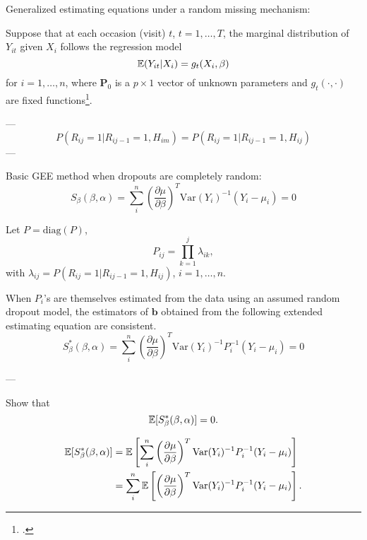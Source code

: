 \documentclass[UTF8,a4paper,10pt]{article}
\begin{document}
\begin{Problem}[]{Generalized estimating equations under a random missing mechanism:}



    Suppose that at each occasion (visit) $t$, $t = 1, \ldots, T$, the marginal distribution of $Y_{it}$ given $X_i$ follows the regression model
    \[
    \operatorname{\mathbb{E}}(Y_{it}|X_i) = g_t(X_i, \beta) 
    \]
    for $i = 1, \ldots, n$, where $\mathbf{P}_0$ is a $p \times 1$ vector of unknown parameters and $g_t(\cdot, \cdot)$ are fixed functions\Footcite[107]{Robins1995}.
    
---
\[
P(R_{ij}=1|R_{ij-1}=1, H_{im}) = P(R_{ij}=1|R_{ij-1}=1, H_{ij})
\]
---


Basic GEE method when dropouts are completely random:
\[
S_{\beta}(\beta,\alpha) = \sum_{i}^n \left(\frac{\partial \mu}{\partial \beta}\right)^T \text{Var}(Y_i)^{-1}(Y_i - \mu_i) = 0
\]

Let $P=\text{diag}(P)$, 
$$P_{ij}=\prod_{k=1}^{j} \lambda_{ik},$$ 
with $\lambda_{ij}=P(R_{ij}=1|R_{ij-1}=1,H_{ij})$, \(i = 1,\ldots,n\).

When $P_i$'s are themselves estimated from the data using an assumed random dropout model, the estimators of $\mathbf{b}$ obtained from the following extended estimating equation are consistent.
\[
S_{\beta}^*(\beta,\alpha) = \sum_{i}^n \left(\frac{\partial \mu}{\partial \beta}\right)^T \text{Var}(Y_i)^{-1}P_{i}^{-1}(Y_i - \mu_i) = 0
\]

---

Show that 
\[\operatorname{\mathbb{E}}[S_{\beta}^*(\beta,\alpha)]=0.\]
\end{Problem}




\begin{align*}
\operatorname{\mathbb{E}}[S_{\beta}^*(\beta,\alpha)] &= \operatorname{\mathbb{E}}\left[\sum_{i}^n \left(\frac{\partial \mu}{\partial \beta}\right)^T \text{Var}(Y_i)^{-1}P_{i}^{-1}(Y_i - \mu_i)\right] \\
&= \sum_{i}^n \operatorname{\mathbb{E}}\left[\left(\frac{\partial \mu}{\partial \beta}\right)^T \text{Var}(Y_i)^{-1}P_{i}^{-1}(Y_i - \mu_i)\right].
\end{align*}
\end{document}
